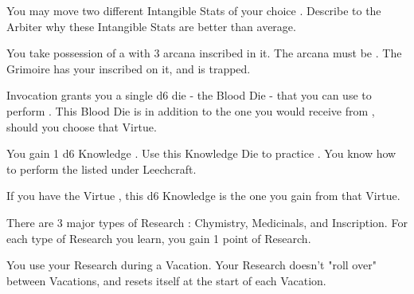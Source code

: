     You may move two different Intangible Stats of your choice \DCUP.  Describe to the Arbiter why these Intangible Stats are better than average.

 


   You take possession of a  with 3  arcana inscribed in it.  The arcana must be .  The Grimoire has your  inscribed on it, and is trapped.
  
  Invocation grants you a single d6 \POOL die - the Blood Die - that you can use to perform .  This Blood Die is in addition to the one you would receive from , should you choose that Virtue.



  
   You gain 1 d6 Knowledge \STATIC.  Use this Knowledge Die to practice .  You know how to perform  the  listed under Leechcraft.

   If you have the Virtue , this d6 Knowledge \STATIC is  the one you gain from that Virtue.




  
  There are 3 major types of Research : Chymistry, Medicinals, and Inscription.  For each type of Research you learn, you gain 1 point of Research.

  You use your Research during a Vacation.  Your Research doesn't "roll over" between Vacations, and resets itself at the start of each Vacation.

  \cbreak

